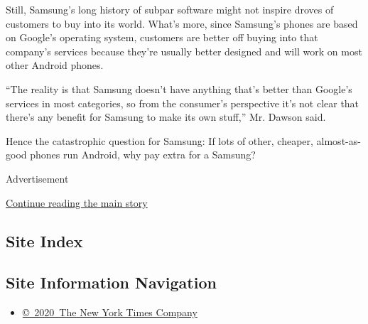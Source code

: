 Still, Samsung's long history of subpar software might not inspire
droves of customers to buy into its world. What's more, since Samsung's
phones are based on Google's operating system, customers are better off
buying into that company's services because they're usually better
designed and will work on most other Android phones.

``The reality is that Samsung doesn't have anything that's better than
Google's services in most categories, so from the consumer's perspective
it's not clear that there's any benefit for Samsung to make its own
stuff,'' Mr. Dawson said.

Hence the catastrophic question for Samsung: If lots of other, cheaper,
almost-as-good phones run Android, why pay extra for a Samsung?

Advertisement

\protect\hyperlink{after-bottom}{Continue reading the main story}

\hypertarget{site-index}{%
\subsection{Site Index}\label{site-index}}

\hypertarget{site-information-navigation}{%
\subsection{Site Information
Navigation}\label{site-information-navigation}}

\begin{itemize}
\tightlist
\item
  \href{https://help.nytimes3xbfgragh.onion/hc/en-us/articles/115014792127-Copyright-notice}{©~2020~The
  New York Times Company}
\end{itemize}

